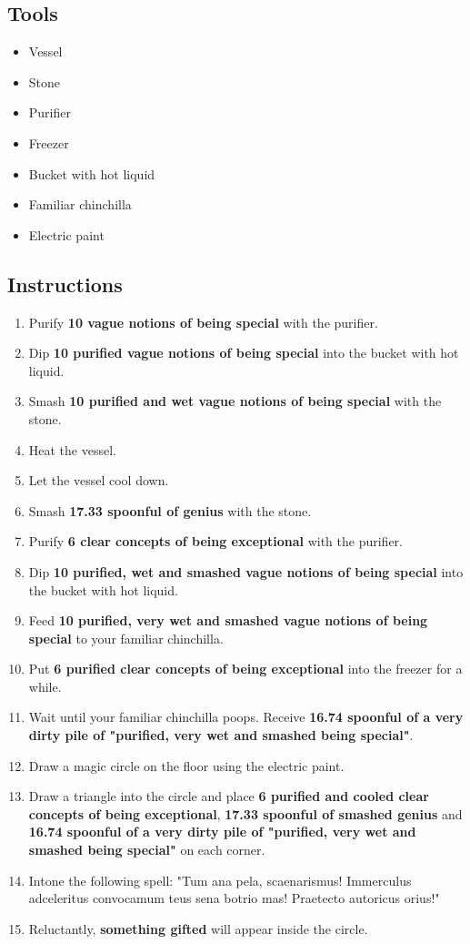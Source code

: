 \documentclass{article}
\begin{document}
\subsection{Tools}\begin{itemize}
\item 
Vessel
\item 
Stone
\item 
Purifier
\item 
Freezer
\item 
Bucket with hot liquid
\item 
Familiar chinchilla
\item 
Electric paint
\end{itemize}
\subsection{Instructions}\begin{enumerate}
\item 
Purify \textbf{10 vague notions of being special} with the purifier.
\item 
Dip \textbf{10 purified vague notions of being special} into the bucket with hot liquid.
\item 
Smash \textbf{10 purified and wet vague notions of being special} with the stone.
\item 
Heat the vessel.
\item 
Let the vessel cool down.
\item 
Smash \textbf{17.33 spoonful of genius} with the stone.
\item 
Purify \textbf{6 clear concepts of being exceptional} with the purifier.
\item 
Dip \textbf{10 purified, wet and smashed vague notions of being special} into the bucket with hot liquid.
\item 
Feed \textbf{10 purified, very wet and smashed vague notions of being special} to your familiar chinchilla.
\item 
Put \textbf{6 purified clear concepts of being exceptional} into the freezer for a while.
\item 
Wait until your familiar chinchilla poops. Receive \textbf{16.74 spoonful of a very dirty pile of "purified, very wet and smashed being special"}.
\item 
Draw a magic circle on the floor using the electric paint.
\item 
Draw a triangle into the circle and place \textbf{6 purified and cooled clear concepts of being exceptional}, \textbf{17.33 spoonful of smashed genius} and \textbf{16.74 spoonful of a very dirty pile of "purified, very wet and smashed being special"} on each corner.
\item 
Intone the following spell: "Tum ana pela, scaenarismus! Immerculus adceleritus convocamum teus sena botrio mas! Praetecto autoricus orius!"
\item 
Reluctantly, \textbf{something gifted} will appear inside the circle.
\end{enumerate}
\newpage
\end{document}
